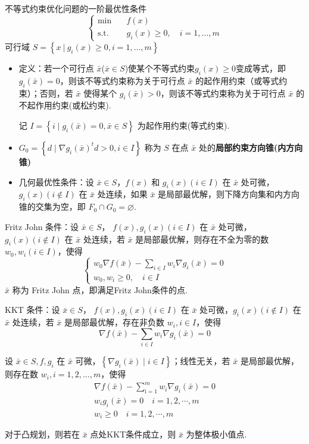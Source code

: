 \begin{note}
    不等式约束优化问题的一阶最优性条件\[\begin{cases}
        \min \quad &f(x)\\
        \text{s.t.} \quad &g_i(x) \ge 0, \quad i = 1, \dots, m
    \end{cases}\]
    可行域 $S = \left\{x\ |\ g_i(x) \ge 0, i = 1, \dots, m\right\}$
    \begin{itemize}
        \item 定义：若一个可行点 $\bar{x}$($\bar{x} \in S$)使某个不等式约束$g_i(x) \ge 0$变成等式，即 $g_i(\bar{x}) = 0$，则该不等式约束称为关于可行点 $\bar{x}$ 的起作用约束（或等式约束）；否则，若 $\bar{x}$ 使得某个 $g_i(\bar{x}) > 0$，则该不等式约束称为关于可行点 $\bar{x}$ 的不起作用约束(或松约束).
        
        记 $I = \left\{i \mid g_i(\bar{x}) = 0, \bar{x} \in S\right\}$ 为起作用约束(等式约束).
        \item $G_0 = \left\{d \mid \nabla g_i(\bar{x})^td > 0, i \in I\right\}$ 称为 $S$ 在点 $\bar{x}$ 处的\textbf{局部约束方向锥(内方向锥)}
        \item 几何最优性条件：设 $\bar{x} \in S$，$f(x)$ 和 $g_i(x)(i \in I)$ 在 $\bar{x}$ 处可微，$g_i(x)(i \notin I)$ 在 $\bar{x}$ 处连续，如果 $\bar{x}$ 是局部最优解，则下降方向集和内方向锥的交集为空，即 $F_0\cap G_0 = \varnothing$.
    \end{itemize}
\end{note}

\begin{theorem}
    Fritz John 条件：设 $\bar{x} \in S$， $f(x), g_i(x)(i \in I)$ 在 $\bar{x}$ 处可微，$g_i(x)(i\notin I)$ 在 $\bar{x}$ 处连续，若 $\bar{x}$ 是局部最优解，则存在不全为零的数 $w_0, w_i(i \in I)$，使得 \[\begin{cases}
        w_{0} \nabla f(\bar{x})-\sum_{i \in I} w_{i} \nabla g_{i}(\bar{x})=0 \\
        w_{0}, w_{i} \geq 0, \quad i \in I
    \end{cases}\] $\bar{x}$ 称为 Fritz John 点，即满足Fritz John条件的点.
\end{theorem}

\begin{theorem}
    KKT 条件：设 $\bar{x} \in S$， $f(x), g_i(x)(i \in I)$ 在 $\bar{x}$ 处可微，$g_i(x)(i\notin I)$ 在 $\bar{x}$ 处连续，若 $\bar{x}$ 是局部最优解，存在非负数 $w_i, i \in I$，使得\[\nabla f(\bar{x}) - \sum_{i \in I}w_i\nabla g_i(\bar{x}) = 0\]
    
    设 $\bar{x} \in S, f, g_i$ 在 $\bar{x}$ 可微，$\left\{\nabla g_i(\bar{x}) \mid i \in I\right\}$；线性无关，若 $\bar{x}$ 是局部最优解，则存在数 $w_i, i=1, 2, \dots, m$，使得\[\begin{array}{l}
        \nabla f(\bar{x})-\sum_{\mathrm{i}=1}^{m} w_{i} \nabla g_{i}(\bar{x})=0 \\
        w_{i} g_{i}(\bar{x})=0 \quad i=1,2, \cdots, m \\
        w_{i} \geq 0 \quad i=1,2, \cdots, m 
    \end{array}\]

    对于凸规划，则若在 $\bar{x}$ 点处KKT条件成立，则 $\bar{x}$ 为整体极小值点.
\end{theorem}

